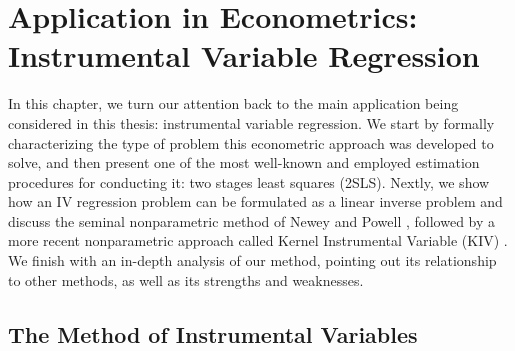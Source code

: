 \chapter{Application in Econometrics: Instrumental Variable Regression}

In this chapter, we turn our attention back to the main application being considered in this thesis: instrumental variable  regression.
We start by formally characterizing the type of problem this econometric approach was developed to solve, and then present one of the most well-known and employed estimation procedures for conducting it: two stages least squares (2SLS).
Nextly, we show how an IV regression problem can be formulated as a linear inverse problem and discuss the seminal nonparametric method of Newey and Powell \cite{newey2003}, followed by a more recent nonparametric approach called Kernel Instrumental Variable (KIV) \cite{singh2019}.
We finish with an in-depth analysis of our method, pointing out its relationship to other methods, as well as its strengths and weaknesses.

\section{The Method of Instrumental Variables}
